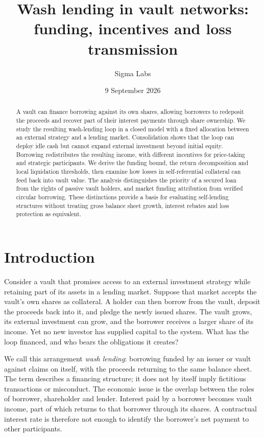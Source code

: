 \documentclass[12pt,oneside]{article}
\title{Wash lending in vault networks:\\funding, incentives and loss transmission}
\author{Sigma Labs}
\date{9 September 2026}
\begin{document}
\maketitle
\begin{abstract}
A vault can finance borrowing against its own shares, allowing borrowers
to redeposit the proceeds and recover part of their interest payments
through share ownership. We study the resulting wash-lending loop in a
closed model with a fixed allocation between an external strategy and
a lending market. Consolidation shows that the loop can deploy idle
cash but cannot expand external investment beyond initial equity.
Borrowing redistributes the resulting income, with different incentives
for price-taking and strategic participants. We derive the funding
bound, the return decomposition and local liquidation thresholds, then
examine how losses in self-referential collateral can feed back into
vault value. The analysis distinguishes the priority of a secured loan
from the rights of passive vault holders, and market funding attribution
from verified circular borrowing. These distinctions provide a basis
for evaluating self-lending structures without treating gross balance
sheet growth, interest rebates and loss protection as equivalent.
\end{abstract}

\section{Introduction}
\label{sec:introduction}
Consider a vault that promises access to an external investment
strategy while retaining part of its assets in a lending market.
Suppose that market accepts the vault's own shares as collateral.
A holder can then borrow from the vault, deposit the proceeds back
into it, and pledge the newly issued shares. The vault grows, its
external investment can grow, and the borrower receives a larger share
of its income. Yet no new investor has supplied capital to the system.
What has the loop financed, and who bears the obligations it creates?

We call this arrangement \emph{wash lending}: borrowing funded by an
issuer or vault against claims on itself, with the proceeds returning
to the same balance sheet. The term describes a financing structure;
it does not by itself imply fictitious transactions or misconduct.
The economic issue is the overlap between the roles of borrower,
shareholder and lender. Interest paid by a borrower becomes vault
income, part of which returns to that borrower through its shares.
A contractual interest rate is therefore not enough to identify the
borrower's net payment to other participants.
\end{document}

